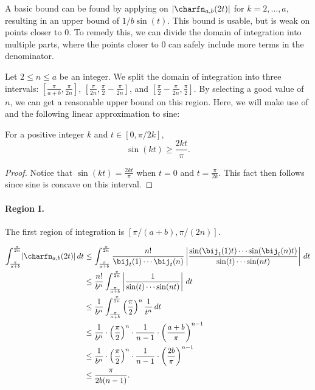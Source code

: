 \documentclass{toc}
\begin{document}
A basic bound can be found by applying  on $\lvert\charfn_{a,b}(2t)\rvert$ for $k=2,\dots,a$, resulting in an upper bound of $1/b\sin(t)$. This bound is usable, but is weak on points closer to 0. To remedy this, we can divide the domain of integration into multiple parts, where the points closer to 0 can safely include more terms in the denominator.

Let $2\le n\le a$ be an integer. We split the domain of integration into three intervals: $[\frac{\pi}{a+b}, \frac{\pi}{2n}]$, $[\frac{\pi}{2n},  \frac{\pi}{2}- \frac{\pi}{2n}]$, and $[\frac{\pi}{2}-\frac{\pi}{2n},\frac{\pi}{2}]$. By selecting a good value of $n$, we can get a reasonable upper bound on this region.
Here, we will make use of  and the following linear approximation to sine: 

\begin{fact}
    \label{fact:linearlowerbound}
    For a positive integer $k$ and $t\in [0, \pi/2k]$,
    \[\sin(kt)\ge \frac{2kt}{\pi }. \]
\end{fact}

\begin{proof}
    Notice that $\sin(kt)=\frac{2kt}{\pi}$ when $t=0$ and $t=\frac{\pi}{2k}$. This fact then follows since sine is concave on this interval.     
\end{proof}

\paragraph{Region I.}

The first region of integration is $[\pi/(a+b),\pi/(2n)]$.

\begin{align*}
    \int_{\frac{\pi}{a+b}}^{\frac{\pi}{2n}} \lvert\charfn_{a,b}(2t)\rvert\,dt &\le  \int_{\frac{\pi}{a+b}}^{\frac{\pi}{2n}} \frac{n!}{\bij_t(1)\cdots \bij_t(n)} \left\lvert \frac{\sin(\bij_t(1)t)\cdots \sin(\bij_t(n)t)}{\sin(t)\cdots \sin(nt)}\right\rvert \, dt \\
    &\le \frac{n!}{b^n}\int_{\frac{\pi}{a+b}}^{\frac{\pi}{2n}} \left\lvert\frac{1}{\sin(t)\cdots \sin(nt)} \right\rvert\,dt \\
    &\le \frac{1}{b^n}\int_{\frac{\pi}{a+b}}^{\frac{\pi}{2n}} \left(\frac{\pi}{2}\right)^n \frac{1}{t^n}\,dt\\
    &\le \frac{1}{b^n}\cdot \left(\frac{\pi}{2}\right)^n \cdot\frac{1}{n-1}\cdot \left(\frac{a+b}{\pi}\right)^{n-1}\\
    &\le \frac{1}{b^n}\cdot \left(\frac{\pi}{2}\right)^n \cdot\frac{1}{n-1}\cdot \left(\frac{2b}{\pi}\right)^{n-1}\\
    &\le \frac{\pi}{2b(n-1)}.
\end{align*}
\end{document}
